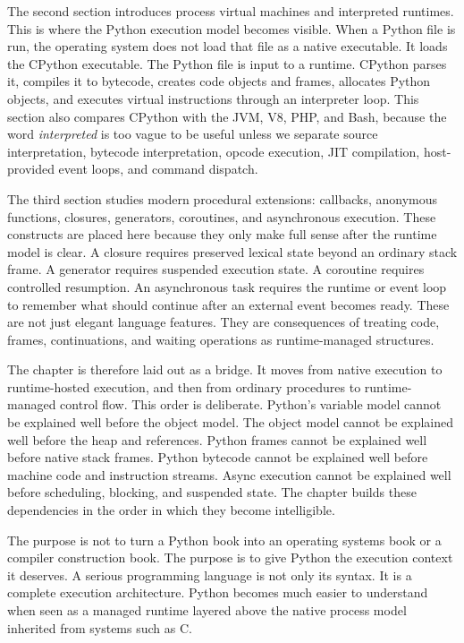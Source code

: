 The second section introduces process virtual machines and interpreted runtimes. This is where the Python execution model becomes visible. When a Python file is run, the operating system does not load that file as a native executable. It loads the CPython executable. The Python file is input to a runtime. CPython parses it, compiles it to bytecode, creates code objects and frames, allocates Python objects, and executes virtual instructions through an interpreter loop. This section also compares CPython with the JVM, V8, PHP, and Bash, because the word \emph{interpreted} is too vague to be useful unless we separate source interpretation, bytecode interpretation, opcode execution, JIT compilation, host-provided event loops, and command dispatch.

The third section studies modern procedural extensions: callbacks, anonymous functions, closures, generators, coroutines, and asynchronous execution. These constructs are placed here because they only make full sense after the runtime model is clear. A closure requires preserved lexical state beyond an ordinary stack frame. A generator requires suspended execution state. A coroutine requires controlled resumption. An asynchronous task requires the runtime or event loop to remember what should continue after an external event becomes ready. These are not just elegant language features. They are consequences of treating code, frames, continuations, and waiting operations as runtime-managed structures.

The chapter is therefore laid out as a bridge. It moves from native execution to runtime-hosted execution, and then from ordinary procedures to runtime-managed control flow. This order is deliberate. Python's variable model cannot be explained well before the object model. The object model cannot be explained well before the heap and references. Python frames cannot be explained well before native stack frames. Python bytecode cannot be explained well before machine code and instruction streams. Async execution cannot be explained well before scheduling, blocking, and suspended state. The chapter builds these dependencies in the order in which they become intelligible.

The purpose is not to turn a Python book into an operating systems book or a compiler construction book. The purpose is to give Python the execution context it deserves. A serious programming language is not only its syntax. It is a complete execution architecture. Python becomes much easier to understand when seen as a managed runtime layered above the native process model inherited from systems such as C.

